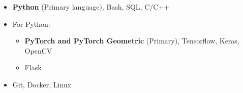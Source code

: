 \begin{itemize}
	\item \textbf{Python} (Primary language), Bash, SQL, C/C++
	\item For Python:
	\begin{itemize}
		\item \textbf{PyTorch and PyTorch Geometric} (Primary), Tensorflow, Keras, OpenCV
		\item Flask
	\end{itemize}    
	\item Git, Docker, Linux
\end{itemize}

